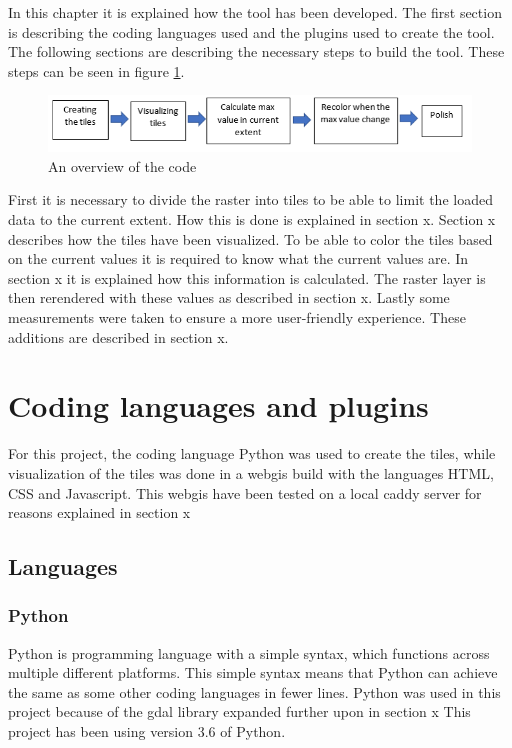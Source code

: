 In this chapter it is explained how the tool has been developed. The first section is describing the coding languages used and the plugins used to create the tool. The following sections are describing the necessary steps to build the tool. These steps can be seen in figure \ref{DevelopmentSteps}.

\begin{figure} [H]
	\centering
	\includegraphics[width=.8\textwidth]{Pictures/DevelopmentSteps}
	\caption{An overview of the code}
	\label{DevelopmentSteps}
\end{figure}

First it is necessary to divide the raster into tiles to be able to limit the loaded data to the current extent. How this is done is explained in section x. Section x describes how the tiles have been visualized. To be able to color the tiles based on the current values it is required to know what the current values are. In section x it is explained how this information is calculated. The raster layer is then rerendered with these values as described in section x. Lastly some measurements were taken to ensure a more user-friendly experience. These additions are described in section x. 

\chapter{Coding languages and plugins}
For this project, the coding language Python was used to create the tiles, while visualization of the tiles was done in a webgis build with the languages HTML, CSS and Javascript. This webgis have been tested on a local caddy server for reasons explained in section x

\section{Languages}
\subsection*{Python}
Python is programming language with a simple syntax, which functions across multiple different platforms. This simple syntax means that Python can achieve the same as some other coding languages in fewer lines.\citep{WhatIsPython}
Python was used in this project because of the gdal library expanded further upon in section x
This project has been using version 3.6 of Python. 
